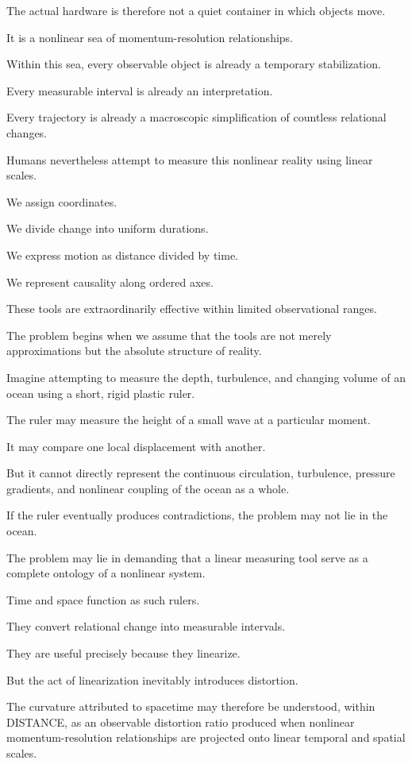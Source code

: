 The actual hardware is therefore not a quiet container in which objects move.

It is a nonlinear sea of momentum-resolution relationships.

Within this sea, every observable object is already a temporary stabilization.

Every measurable interval is already an interpretation.

Every trajectory is already a macroscopic simplification of countless relational changes.

Humans nevertheless attempt to measure this nonlinear reality using linear scales.

We assign coordinates.

We divide change into uniform durations.

We express motion as distance divided by time.

We represent causality along ordered axes.

These tools are extraordinarily effective within limited observational ranges.

The problem begins when we assume that the tools are not merely approximations but the absolute structure of reality.

Imagine attempting to measure the depth, turbulence, and changing volume of an ocean using a short, rigid plastic ruler.

The ruler may measure the height of a small wave at a particular moment.

It may compare one local displacement with another.

But it cannot directly represent the continuous circulation, turbulence, pressure gradients, and nonlinear coupling of the ocean as a whole.

If the ruler eventually produces contradictions, the problem may not lie in the ocean.

The problem may lie in demanding that a linear measuring tool serve as a complete ontology of a nonlinear system.

Time and space function as such rulers.

They convert relational change into measurable intervals.

They are useful precisely because they linearize.

But the act of linearization inevitably introduces distortion.

The curvature attributed to spacetime may therefore be understood, within DISTANCE, as an observable distortion ratio produced when nonlinear momentum-resolution relationships are projected onto linear temporal and spatial scales.

